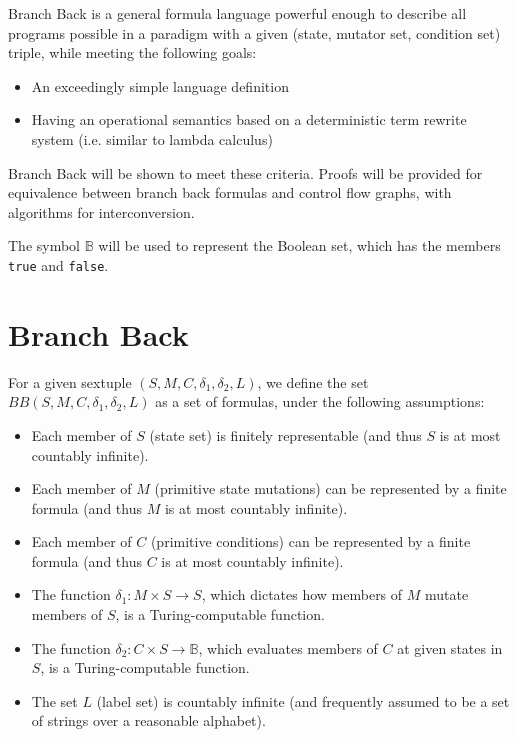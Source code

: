 \documentclass[11pt]{article}
\begin{document}
Branch Back is a general formula language powerful enough to describe all programs possible in a paradigm with a given (state, mutator set, condition set) triple, while meeting the following goals:

\begin{itemize}
\item An exceedingly simple language definition
\item Having an operational semantics based on a deterministic term rewrite system (i.e. similar to lambda calculus)
\end{itemize}

Branch Back will be shown to meet these criteria.  Proofs will be provided for equivalence between branch back formulas and control flow graphs, with algorithms for interconversion.

The symbol $\mathbb{B}$ will be used to represent the Boolean set, which has the members \texttt{true} and \texttt{false}.

\section{Branch Back}
For a given sextuple $(S, M, C, \delta_{1}, \delta_{2}, L)$, we define the set $BB(S, M, C, \delta_{1}, \delta_{2}, L)$ as a set of formulas, under the following assumptions:

\begin{itemize}
\item Each member of $S$ (state set) is finitely representable (and thus $S$ is at most countably infinite).
\item Each member of $M$ (primitive state mutations) can be represented by a finite formula (and thus $M$ is at most countably infinite).
\item Each member of $C$ (primitive conditions) can be represented by a finite formula (and thus $C$ is at most countably infinite).
\item The function $\delta_{1} : M \times S \rightarrow S$, which dictates how members of $M$ mutate members of $S$, is a Turing-computable function. 
\item The function $\delta_{2} : C \times S \rightarrow \mathbb{B}$, which evaluates members of $C$ at given states in $S$, is a Turing-computable function.
\item The set $L$ (label set) is countably infinite (and frequently assumed to be a set of strings over a reasonable alphabet).
\end{itemize}
\end{document}
